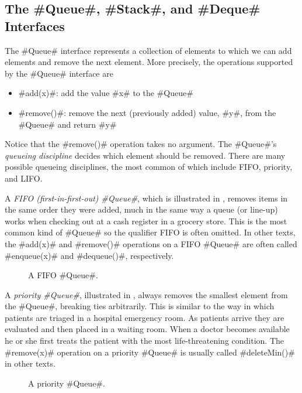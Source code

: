\subsection{The #Queue#, #Stack#, and #Deque# Interfaces}

The #Queue# interface represents a collection of elements to which we
can add elements and remove the next element.  More precisely, the operations
supported by the #Queue# interface are
\begin{itemize}
  \item #add(x)#: add the value #x# to the #Queue#
  \item #remove()#: remove the next (previously added) value, #y#, from the #Queue# and return #y#
\end{itemize}
Notice that the #remove()# operation takes no argument.  The #Queue#'s
\emph{queueing discipline} decides which element should be removed.
There are many possible queueing disciplines, the most common of which
include FIFO, priority, and LIFO.

A \emph{FIFO (first-in-first-out) #Queue#},
%
%
which is illustrated in
, removes items in the same order they were added, much
in the same way a queue (or line-up) works when checking out at a cash
register in a grocery store.  This is the most common kind of #Queue#
so the qualifier FIFO is often omitted.  In other texts, the #add(x)#
and #remove()# operations on a FIFO #Queue# are often called #enqueue(x)#
and #dequeue()#, respectively.

\begin{figure}
  \caption[A FIFO queue]{A FIFO #Queue#.}
\end{figure}

A \emph{priority #Queue#},
%
%
%
illustrated in , always
removes the smallest element from the #Queue#, breaking ties arbitrarily.
This is similar to the way in which patients are triaged in a hospital
emergency room.  As patients arrive they are evaluated and then placed in
a waiting room.  When a doctor becomes available he or she first treats
the patient with the most life-threatening condition.  The #remove(x)#
operation on a priority #Queue# is usually called #deleteMin()# in
other texts.

\begin{figure}
  \caption[A priority queue]{A priority #Queue#.}
\end{figure}

